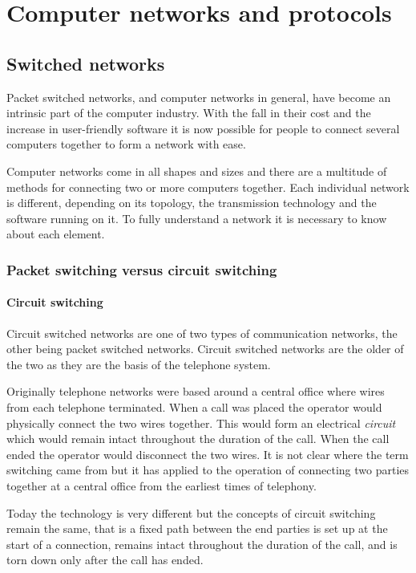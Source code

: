 \chapter{Computer networks and protocols}
\label{network}

\section{Switched networks}

Packet switched networks, and computer networks in general, have
become an intrinsic part of the computer industry.  With the fall in
their cost and the increase in user-friendly software it is now
possible for people to connect several computers together to form a
network with ease.

Computer networks come in all shapes and sizes and there are a
multitude of methods for connecting two or more computers together.
Each individual network is different, depending on its topology, the
transmission technology and the software running on it.  To fully
understand a network it is necessary to know about each element.

\subsection{Packet switching versus circuit switching}

\subsubsection{Circuit switching}

Circuit switched networks are one of two types of communication
networks, the other being packet switched networks.  Circuit switched
networks are the older of the two as they are the basis of the
telephone system.

Originally telephone networks were based around a central office
where wires from each telephone terminated.  When a call was placed
the operator would physically connect the two wires together.  This
would form an electrical {\em circuit} which would remain intact
throughout the duration of the call.  When the call ended the operator
would disconnect the two wires.  It is not clear where the term
switching came from but it has applied to the operation of connecting
two parties together at a central office from the earliest times of
telephony.

Today the technology is very different but the concepts of circuit
switching remain the same, that is a fixed path between the end
parties is set up at the start of a connection, remains intact
throughout the duration of the call, and is torn down only after the
call has ended.

